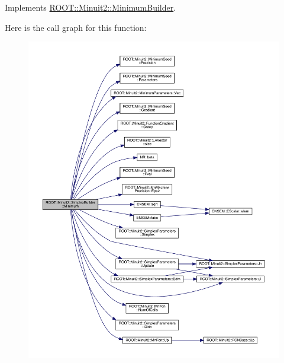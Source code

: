Implements \mbox{\hyperlink{classROOT_1_1Minuit2_1_1MinimumBuilder_aefaa624436afa8195af1f3393a35981f}{R\+O\+O\+T\+::\+Minuit2\+::\+Minimum\+Builder}}.

Here is the call graph for this function\+:
\nopagebreak
\begin{figure}[H]
\begin{center}
\leavevmode
\includegraphics[width=350pt]{d1/dbe/classROOT_1_1Minuit2_1_1SimplexBuilder_a82c52765929e3f4a41b1abe1473d4140_cgraph}
\end{center}
\end{figure}
\mbox{\label{classROOT_1_1Minuit2_1_1SimplexBuilder_a68ea5d16ee89941e9674eb673dbde593}} 
